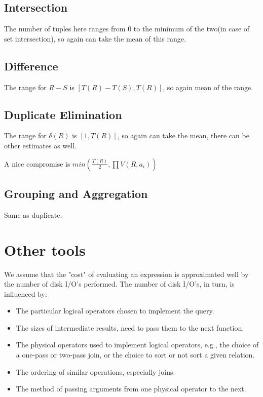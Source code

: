 \subsection{Intersection}
The number of tuples here ranges from $0$ to the minimum of the two(in case of set intersection), so again can take the mean of this range.

\subsection{Difference}
The range for $R-S$ is $[T(R)-T(S),T(R)]$, so again mean of the range.

\subsection{Duplicate Elimination}
The range for $\delta(R)$ is $[1, T(R)]$, so again can take the mean, there can be other estimates as well.
\par A nice compromise is $min(\frac{T(R)}{2}, \prod V(R,a_i))$

\subsection{Grouping and Aggregation}
Same as duplicate.


\section{Other tools}
We assume that the "cost" of evaluating an expression is approximated well by the number of disk I/O's performed. The number of disk I/O's, in turn, is influenced by:
\begin{itemize}
    \item The particular logical operators chosen to implement the query.
    \item The sizes of intermediate results, need to pass them to the next function.
    \item The physical operators used to implement logical operators, e.g., the choice of a one-pass or two-pass join, or the choice to sort or not sort a given relation.
    \item The ordering of similar operations, especially joins.
    \item The method of passing arguments from one physical operator to the next.
\end{itemize}

